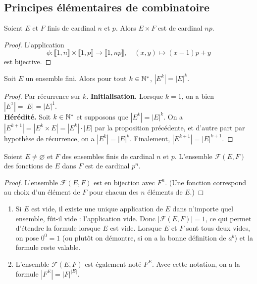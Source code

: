 \subsection{Principes élémentaires de combinatoire}

\begin{proposition}\label{prop-cardinal-produit}
Soient $E$ et $F$ finis de cardinal $n$ et $p$. Alors $E\times F$ est de cardinal $np$.
\end{proposition}
\begin{proof}
L'application 
\[
\phi : \llbracket 1,n\rrbracket \times \llbracket 1,p\rrbracket\to \llbracket 1,np\rrbracket,\quad
(x,y)\mapsto (x-1)p+y
\]
est bijective.
\end{proof}
\begin{corollaire}\label{prop-cardinal-puissance}
Soit $E$ un ensemble fini. Alors pour tout $k\in \mathbb{N}^*$, $|E^k|=|E|^k$.
\end{corollaire}
\begin{proof}
Par récurrence sur $k$. 
\textbf{Initialisation. }Lorsque $k=1$, on a bien  $|E^1|=|E|=|E|^1$.\\
\textbf{Hérédité.} Soit $k\in \mathbb{N}^*$ et supposons que $|E^k|=|E|^k$.
On a $|E^{k+1}| = |E^k\times E|=|E^k|\cdot |E|$ par la proposition précédente, et d'autre part par hypothèse de récurrence, on a $|E^k|=|E|^k$. Finalement,  $|E^{k+1}|=|E|^{k+1}$. 
\end{proof}

\begin{corollaire}\label{prop-cardinal-fonctions}
Soient $E\neq \varnothing$ et $F$ des ensembles finis de cardinal  $n$ et $p$. L'ensemble $\mathcal F(E,F)$ des fonctions de $E$ dans $F$ est de cardinal $p^n$. 
\end{corollaire}
\begin{proof}
L'ensemble $\mathcal F(E,F)$ est en bijection avec $F^n$. (Une fonction correspond au choix d'un élément de $F$ pour chacun des $n$ éléments de $E$.) 
\end{proof}

\begin{remarque}
\begin{enumerate}
\item Si $E$ est vide, il existe une unique application de $E$ dans n'importe quel ensemble, fût-il vide : l'application vide. Donc $|\mathcal F(E,F)|=1$, ce qui permet d'étendre la formule lorsque $E$ est vide. Lorsque $E$ et $F$ sont tous deux vides, on pose $0^0=1$ (ou plutôt on démontre, si on a la \og bonne\fg{} définition de $a^b$) et la formule reste valable.
\item L'ensemble $\mathcal F(E,F)$ est également noté $F^E$. Avec cette notation, on a la formule $\left| F^E\right| = |F|^{|E|}$.
\end{enumerate}
\end{remarque}

